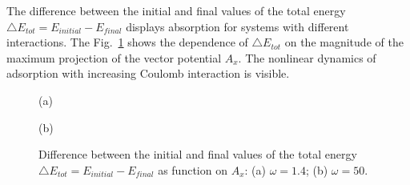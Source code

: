 The difference between the initial and final values of the total energy $\bigtriangleup E_{tot}=E_{initial}-E_{final}$ displays absorption for systems with different interactions. The Fig.~\ref{fig:dEtot_A_FS} shows the dependence of $\bigtriangleup E_{tot}$ on the magnitude of the maximum projection of the vector potential $A_x$. The nonlinear dynamics of adsorption with increasing Coulomb interaction is visible.
\begin{figure}[h!]
\begin{minipage}[h]{0.5\linewidth}
 (a) \\
\end{minipage}
\hfill
\begin{minipage}[h]{0.5\linewidth}
 (b) \\
\end{minipage}
\caption{Difference between the initial and final values of the total energy $\bigtriangleup E_{tot}=E_{initial}-E_{final}$ as function on $A_x$: (a) $\omega=1.4$; (b) $\omega=50$.}
\label{fig:dEtot_A_FS}
\end{figure}


